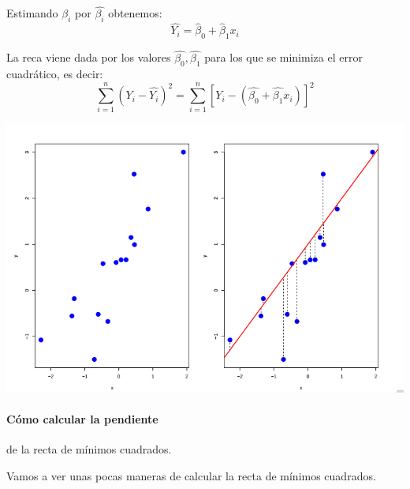 \documentclass[palatino,nochap]{apuntes}
\begin{document}
\begin{defn}
Estimando $β_i$ por $\hat{β_i}$ obtenemos: \[\hat{Y_i} = \hat{β}_0 + \hat{β}_1 x_i\]

La reca viene dada por los valores $\hat{β_0}, \hat{β_1}$ para los que se minimiza el error cuadrático, es decir:
\[\sum_{i=1}^n \left(Y_i - \hat{Y_i}\right)^2 =  \sum_{i=1}^n \left[ Y_i - (\hat{β_0} + \hat{β_1}x_i) \right]^2\]
\end{defn}

\begin{example}
\begin{center}
\includegraphics[scale=0.6]{img/ejemploRectaRegresionLineal.png}
\end{center}
\end{example}

\paragraph{Cómo calcular la pendiente} de la recta de mínimos cuadrados.


Vamos a ver unas pocas maneras de calcular la recta de mínimos cuadrados.
\end{document}
